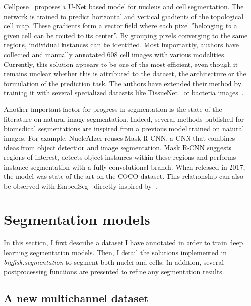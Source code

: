 Cellpose~\cite{stringer_cellpose_2021} proposes a U-Net based model for nucleus and cell segmentation.
The network is trained to predict horizontal and vertical gradients of the topological cell map.
These gradients form a vector field where each pixel ''belonging to a given cell can be routed to its center''.
By grouping pixels converging to the same regions, individual instances can be identified.
Most importantly, authors have collected and manually annotated 608 cell images with various modalities.
Currently, this solution appears to be one of the most efficient, even though it remains unclear whether this is attributed to the dataset, the architecture or the formulation of the prediction task. 
The authors have extended their method by training it with several specialized datasets like TissueNet~\cite{Greenwald_2022} or bacteria images~\cite{cutler_omnipose_2022}.

Another important factor for progress in segmentation is the state of the literature on natural image segmentation.
Indeed, several methods published for biomedical segmentations are inspired from a previous model trained on natural images.
For example, NucleAIzer reuses Mask R-CNN, a \ac{CNN} that combines ideas from object detection and image segmentation. Mask R-CNN suggests regions of interest, detects object instances within these regions and performs instance segmentation with a fully convolutional branch.
When released in 2017, the model was state-of-the-art on the COCO dataset.
This relationship can also be observed with EmbedSeg~\cite{Lalit_2021} directly inspired by~\cite{Neven_2019_CVPR}.

\section{Segmentation models}
\label{sec:segmentation_nuc_cell}

In this section, I first describe a dataset I have annotated in order to train deep learning segmentation models.
Then, I detail the solutions implemented in \emph{bigfish.segmentation} to segment both nuclei and cells.
In addition, several postprocessing functions are presented to refine any segmentation results.

\subsection{A new multichannel dataset}
\label{subsec:segmentation_data}

